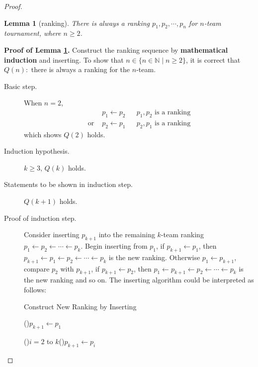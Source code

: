 \documentclass[12pt,a4paper]{article}
\newtheorem{lemma}[theorem]{Lemma}
\theoremstyle{definition}
\begin{document}
\begin{enumerate}
\begin{proof}
    \begin{lemma}[ranking]\label{lem:rk}
        There is always a ranking $p_1,p_2,\cdots,p_n$ for $n$-team tournament, where $n\geq 2$.
    \end{lemma}
    \vspace{-2\parskip}
    \textbf{Proof of Lemma \ref{lem:rk}.}
    Construct the ranking sequence by \textbf{mathematical induction} and inserting. To show that $n\in \{n\in \mathbb{N}\mid n\geq 2\}$, it is correct that $Q(n):$ there is always a ranking for the $n$-team.
    \begin{description}
        \item[Basic step.] When $n=2$,
        \begin{align*}
            &p_1\leftarrow p_2 && p_1,p_2\text{ is a ranking}\\
            \text{or~} & p_2\leftarrow p_1 && p_2,p_1\text{ is a ranking}
        \end{align*}
        which shows $Q(2)$ holds.
        \item[Induction hypothesis.] $k\geq 3$, $Q(k)$ holds.
        \item[Statements to be shown in induction step.] $Q(k+1)$ holds.
        \item[Proof of induction step.] Consider inserting $p_{k+1}$ into the remaining $k$-team ranking $p_1\leftarrow p_2\leftarrow \cdots \leftarrow p_k$. Begin inserting from $p_1$, if $p_{k+1}\leftarrow p_1$, then $p_{k+1}\leftarrow p_1\leftarrow p_2\leftarrow \cdots \leftarrow p_k$ is the new ranking. Otherwise $p_1\leftarrow p_{k+1}$, compare $p_2$ with $p_{k+1}$, if $p_{k+1}\leftarrow p_2$, then $p_1\leftarrow p_{k+1}\leftarrow  p_2\leftarrow \cdots \leftarrow p_k$ is the new ranking and so on. The inserting algorithm could be interpreted as follows:
         
        \begin{minipage}{0.88\textwidth}
        \begin{algorithm}[H]
            \BlankLine
            \caption{Construct New Ranking by Inserting} \label{Alg-Cons}
            
            \If(){$p_{k+1}\leftarrow p_1$}{\;}

            \For(){$i= 2$ to $k$}{\If(){$p_{k+1}\leftarrow p_i$}{\;}}


\end{algorithm}
\end{minipage}
\end{description}
\end{proof}
\end{enumerate}
\end{document}
